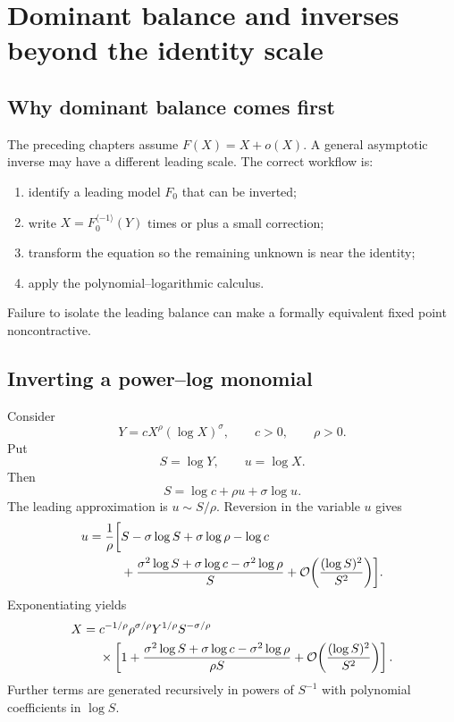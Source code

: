 \documentclass[11pt,oneside]{book}
\theoremstyle{definition}
\theoremstyle{remark}
\newcommand{\bigO}{\mathcal O}
\newcommand{\compinv}{^{\langle-1\rangle}}
\begin{document}
\chapter{Dominant balance and inverses beyond the identity scale}
\label{ch:reversion-general}

\section{Why dominant balance comes first}
The preceding chapters assume $F(X)=X+o(X)$.  A general asymptotic inverse may
have a different leading scale.  The correct workflow is:
\begin{enumerate}
\item identify a leading model $F_0$ that can be inverted;
\item write $X=F_0\compinv(Y)$ times or plus a small correction;
\item transform the equation so the remaining unknown is near the identity;
\item apply the polynomial--logarithmic calculus.
\end{enumerate}
Failure to isolate the leading balance can make a formally equivalent fixed
point noncontractive.

\section{Inverting a power--log monomial}
Consider
\begin{equation}\label{eq:power-log-leading}
 Y=cX^\rho(\log X)^\sigma,
 \qquad c>0,
 \qquad \rho>0.
\end{equation}
Put
\[
 S=\log Y,
 \qquad u=\log X.
\]
Then
\begin{equation}\label{eq:power-log-logeq}
 S=\log c+\rho u+\sigma\log u.
\end{equation}
The leading approximation is $u\sim S/\rho$.  Reversion in the variable $u$
gives
\begin{align}\label{eq:u-power-log-inverse}
 u=\frac1\rho\biggl[&S-\sigma\log S+\sigma\log\rho-\log c\\
 &+\frac{\sigma^2\log S+\sigma\log c-\sigma^2\log\rho}{S}
 +\bigO\!\left(\frac{(\log S)^2}{S^2}\right)\biggr].\notag
\end{align}
Exponentiating yields
\begin{align}\label{eq:X-power-log-inverse}
 X={}&c^{-1/\rho}\rho^{\sigma/\rho}Y^{1/\rho}
 S^{-\sigma/\rho}\\
 &\times\left[1+
 \frac{\sigma^2\log S+\sigma\log c-\sigma^2\log\rho}
      {\rho S}
 +\bigO\!\left(\frac{(\log S)^2}{S^2}\right)\right].\notag
\end{align}
Further terms are generated recursively in powers of $S^{-1}$ with
polynomial coefficients in $\log S$.
\end{document}
